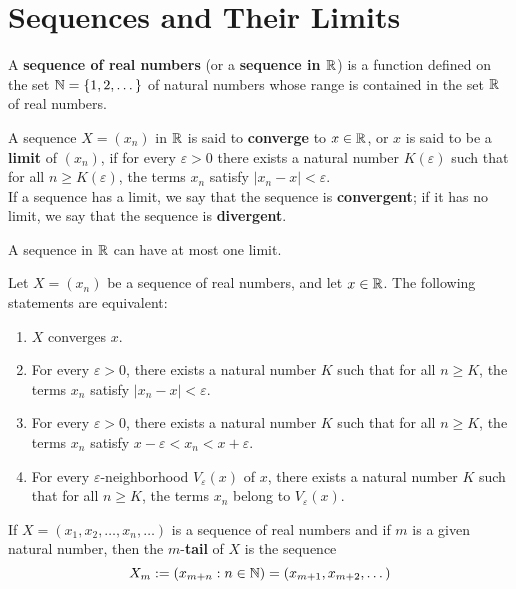 \section{Sequences and Their Limits}

\begin{definition}
	A \textbf{sequence of real numbers} (or a \textbf{sequence in $\mathbb{R}$}) is a function defined on the set $\mathbb{N} = \{1,2,\dots\}$ of natural numbers whose range is contained in the set $\mathbb{R}$ of real numbers.
\end{definition}

\begin{definition}
	A sequence $X = (x_n)$ in $\mathbb{R}$ is said to \textbf{converge} to $x \in \mathbb{R}$, or $x$ is said to be a \textbf{limit} of $(x_n)$, if for every $\varepsilon >0$ there exists a natural number $K(\varepsilon)$ such that for all $n \geq K(\varepsilon)$, the terms $x_n$ satisfy $|x_n-x|<\varepsilon$.
	\\If a sequence has a limit, we say that the sequence is \textbf{convergent}; if it has no limit, we say that the sequence is \textbf{divergent}.
\end{definition}

\begin{theorem}
	A sequence in $\mathbb{R}$ can have at most one limit.
\end{theorem}

\begin{theorem}
	Let $X = (x_n)$ be a sequence of real numbers, and let $x \in \mathbb{R}$. The following statements are equivalent:
	\begin{enumerate}
		\item $X$ converges $x$.
		\item For every $\varepsilon > 0$, there exists a natural number $K$ such that for all $n \geq K$, the terms $x_n$ satisfy $|x_n -x| < \varepsilon$.
		\item For every $\varepsilon >0$, there exists a natural number $K$ such that for all $n \geq K$, the terms $x_n$ satisfy $x-\varepsilon < x_n < x+\varepsilon$.
		\item For every $\varepsilon$-neighborhood $V_\varepsilon(x)$ of $x$, there exists a natural number $K$ such that for all $n \geq K$, the terms $x_n$ belong to $V_\varepsilon(x)$.
	\end{enumerate}
\end{theorem}

\begin{definition}
	If $X=(x_1, x_2, \dots, x_n, \dots)$ is a sequence of real numbers and if $m$ is a given natural number, then the $m$-\textbf{tail} of $X$ is the sequence
	\[X_m := (x_{m+n}: n \in \mathbb{N})=(x_{m+1}, x_{m+2}, \dots)\]
\end{definition}

